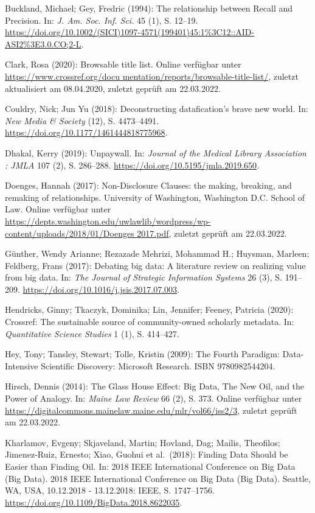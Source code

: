 \documentclass[a4paper,
fontsize=11pt,
oneside,
numbers=noperiodatend,
parskip=half-,
bibliography=totoc,
final
]{scrartcl}
\begin{document}
Buckland, Michael; Gey, Fredric (1994): The relationship between Recall
and Precision. In: \emph{J. Am. Soc. Inf. Sci.} 45 (1), S. 12--19.
\url{https://doi.org/10.1002/(SICI)1097-4571(199401)45:1\%3C12::AID-ASI2\%3E3.0.CO;2-L}.

Clark, Rosa (2020): Browsable title list. Online verfügbar unter
\href{https://www.crossref.org/documentation/reports/browsable-title-list/}{https://www.crossref.org/docu mentation/reports/browsable-title-list/},
zuletzt aktualisiert am 08.04.2020, zuletzt geprüft am 22.03.2022.

Couldry, Nick; Jun Yu (2018): Deconstructing datafication's brave new
world. In: \emph{New Media \& Society} (12), S. 4473--4491.
\url{https://doi.org/10.1177/1461444818775968}.

Dhakal, Kerry (2019): Unpaywall. In: \emph{Journal of the Medical
Library Association : JMLA} 107 (2), S. 286--288.
\url{https://doi.org/10.5195/jmla.2019.650}.

Doenges, Hannah (2017): Non-Disclosure Clauses: the making, breaking,
and remaking of relationships. University of Washington, Washington D.C.
School of Law. Online verfügbar unter
\href{https://depts.washington.edu/uwlawlib/wordpress/wp-content/uploads/2018/01/Doenges2017.pdf}{https://depts.washington.edu/uwlawlib/wordpress/wp-content/uploads/2018/01/Doenges 2017.pdf},
zuletzt geprüft am 22.03.2022.

Günther, Wendy Arianne; Rezazade Mehrizi, Mohammad H.; Huysman, Marleen;
Feldberg, Frans (2017): Debating big data: A literature review on
realizing value from big data. In: \emph{The Journal of Strategic
Information Systems} 26 (3), S. 191--209.
\url{https://doi.org/10.1016/j.jsis.2017.07.003}.

Hendricks, Ginny; Tkaczyk, Dominika; Lin, Jennifer; Feeney, Patricia
(2020): Crossref: The sustainable source of community-owned scholarly
metadata. In: \emph{Quantitative Science Studies} 1 (1), S. 414--427.

Hey, Tony; Tansley, Stewart; Tolle, Kristin (2009): The Fourth Paradigm:
Data-Intensive Scientific Discovery: Microsoft Research. ISBN
9780982544204.

Hirsch, Dennis (2014): The Glass House Effect: Big Data, The New Oil,
and the Power of Analogy. In: \emph{Maine Law Review} 66 (2), S. 373.
Online verfügbar unter
\url{https://digitalcommons.mainelaw.maine.edu/mlr/vol66/iss2/3},
zuletzt geprüft am 22.03.2022.

Kharlamov, Evgeny; Skjaveland, Martin; Hovland, Dag; Mailis, Theofilos;
Jimenez-Ruiz, Ernesto; Xiao, Guohui et al.~(2018): Finding Data Should
be Easier than Finding Oil. In: 2018 IEEE International Conference on
Big Data (Big Data). 2018 IEEE International Conference on Big Data (Big
Data). Seattle, WA, USA, 10.12.2018 - 13.12.2018: IEEE, S. 1747--1756.
\url{https://doi.org/10.1109/BigData.2018.8622035}.
\end{document}
